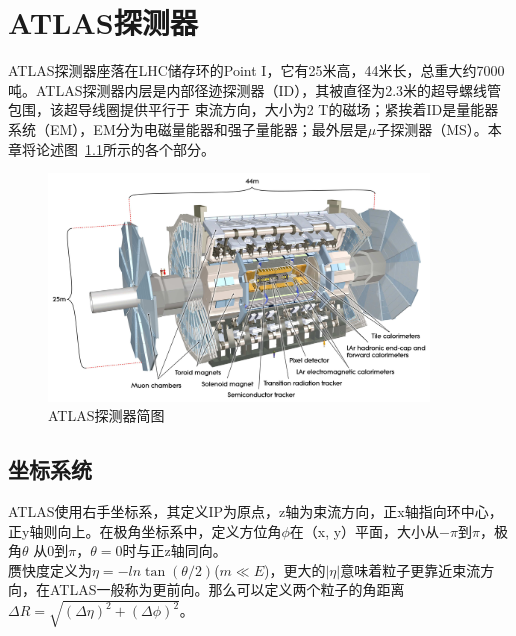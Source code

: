 \chapter{ATLAS探测器} \label{chap:ATLAS}
ATLAS探测器座落在LHC储存环的Point I，它有25米高，44米长，总重大约7000吨。ATLAS探测器内层是内部径迹探测器（ID），其被直径为2.3米的超导螺线管包围，该超导线圈提供平行于
束流方向，大小为2 T的磁场；紧挨着ID是量能器系统（EM），EM分为电磁量能器和强子量能器；最外层是$\mu$子探测器（MS）。本章将论述图~\ref{fig:ATLAS_schematic}所示的各个部分。

\begin{figure}[h]
\begin{center}
\includegraphics[width=0.9\textwidth]{fig/ATLAS_SE_Corrected7.pdf}
\caption{ATLAS探测器简图} \label{fig:ATLAS_schematic}
\end{center}
\end{figure}

\section{坐标系统}
ATLAS使用右手坐标系，其定义IP为原点，z轴为束流方向，正x轴指向环中心，正y轴则向上。在极角坐标系中，定义方位角$\phi$在（x, y）平面，大小从$-\pi$到$\pi$，极角$\theta$
从0到$\pi$，$\theta=0$时与正z轴同向。\\
赝快度定义为$\eta = -ln\tan(\theta/2)$($m\ll E$)，更大的$|\eta|$意味着粒子更靠近束流方向，在ATLAS一般称为更前向。那么可以定义两个粒子的角距离$\Delta R=\sqrt{(\Delta\eta)^2+(\Delta\phi)^2}$。

